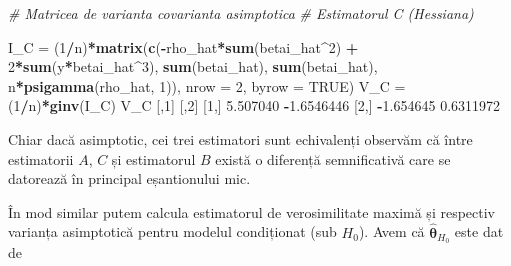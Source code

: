 \documentclass[]{article}
\newenvironment{Shaded}{\begin{snugshade}}{\end{snugshade}}
\newcommand{\KeywordTok}[1]{\textcolor[rgb]{0.13,0.29,0.53}{\textbf{#1}}}
\newcommand{\DataTypeTok}[1]{\textcolor[rgb]{0.13,0.29,0.53}{#1}}
\newcommand{\DecValTok}[1]{\textcolor[rgb]{0.00,0.00,0.81}{#1}}
\newcommand{\FloatTok}[1]{\textcolor[rgb]{0.00,0.00,0.81}{#1}}
\newcommand{\StringTok}[1]{\textcolor[rgb]{0.31,0.60,0.02}{#1}}
\newcommand{\CommentTok}[1]{\textcolor[rgb]{0.56,0.35,0.01}{\textit{#1}}}
\newcommand{\OtherTok}[1]{\textcolor[rgb]{0.56,0.35,0.01}{#1}}
\newcommand{\OperatorTok}[1]{\textcolor[rgb]{0.81,0.36,0.00}{\textbf{#1}}}
\newcommand{\NormalTok}[1]{#1}
\begin{document}
\begin{Shaded}
\begin{Highlighting}[]
\CommentTok{# Matricea de varianta covarianta asimptotica }
\CommentTok{# Estimatorul C (Hessiana)}

\NormalTok{I_C =}\StringTok{ }\NormalTok{(}\DecValTok{1}\OperatorTok{/}\NormalTok{n)}\OperatorTok{*}\KeywordTok{matrix}\NormalTok{(}\KeywordTok{c}\NormalTok{(}\OperatorTok{-}\NormalTok{rho_hat}\OperatorTok{*}\KeywordTok{sum}\NormalTok{(betai_hat}\OperatorTok{^}\DecValTok{2}\NormalTok{) }\OperatorTok{+}\StringTok{ }\DecValTok{2}\OperatorTok{*}\KeywordTok{sum}\NormalTok{(y}\OperatorTok{*}\NormalTok{betai_hat}\OperatorTok{^}\DecValTok{3}\NormalTok{),}
                     \KeywordTok{sum}\NormalTok{(betai_hat),}
                    \KeywordTok{sum}\NormalTok{(betai_hat), }
\NormalTok{                    n}\OperatorTok{*}\KeywordTok{psigamma}\NormalTok{(rho_hat, }\DecValTok{1}\NormalTok{)), }
                  \DataTypeTok{nrow =} \DecValTok{2}\NormalTok{, }
                  \DataTypeTok{byrow =} \OtherTok{TRUE}\NormalTok{)}
\NormalTok{V_C =}\StringTok{ }\NormalTok{(}\DecValTok{1}\OperatorTok{/}\NormalTok{n)}\OperatorTok{*}\KeywordTok{ginv}\NormalTok{(I_C)}
\NormalTok{V_C}
\NormalTok{          [,}\DecValTok{1}\NormalTok{]       [,}\DecValTok{2}\NormalTok{]}
\NormalTok{[}\DecValTok{1}\NormalTok{,]  }\FloatTok{5.507040} \OperatorTok{-}\FloatTok{1.6546446}
\NormalTok{[}\DecValTok{2}\NormalTok{,] }\OperatorTok{-}\FloatTok{1.654645}  \FloatTok{0.6311972}
\end{Highlighting}
\end{Shaded}

Chiar dacă asimptotic, cei trei estimatori sunt echivalenți observăm că
între estimatorii \(A\), \(C\) și estimatorul \(B\) există o diferență
semnificativă care se datorează în principal eșantionului mic.

În mod similar putem calcula estimatorul de verosimilitate maximă și
respectiv varianța asimptotică pentru modelul condiționat (sub \(H_0\)).
Avem că \(\hat{\boldsymbol{\theta}}_{H_0}\) este dat de
\end{document}
